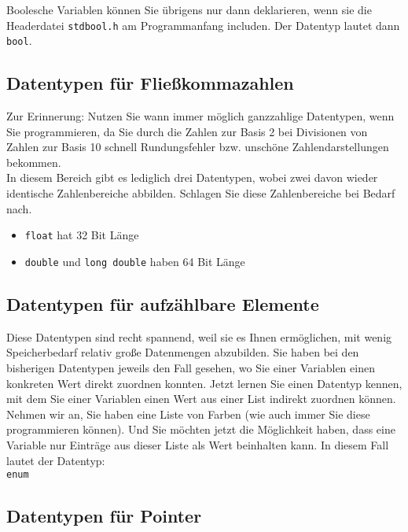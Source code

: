 Boolesche Variablen können Sie übrigens nur dann deklarieren, wenn sie die Headerdatei \verb|stdbool.h| am Programmanfang includen. Der Datentyp lautet dann \verb|bool|.\\

\subsection{Datentypen für Fließkommazahlen}

Zur Erinnerung: Nutzen Sie wann immer möglich ganzzahlige Datentypen, wenn Sie programmieren, da Sie durch die Zahlen zur Basis 2 bei Divisionen von Zahlen zur Basis 10 schnell Rundungsfehler bzw. unschöne Zahlendarstellungen bekommen.\\

In diesem Bereich gibt es lediglich drei Datentypen, wobei zwei davon wieder identische Zahlenbereiche abbilden. Schlagen Sie diese Zahlenbereiche bei Bedarf nach.\\

\begin{itemize}
	\item \verb|float| hat 32 Bit Länge
	\item \verb|double| und \verb|long double| haben 64 Bit Länge
\end{itemize}

\subsection{Datentypen für aufzählbare Elemente}

Diese Datentypen sind recht spannend, weil sie es Ihnen ermöglichen, mit wenig Speicherbedarf relativ große Datenmengen abzubilden. Sie haben bei den bisherigen Datentypen jeweils den Fall gesehen, wo Sie einer Variablen einen konkreten Wert direkt zuordnen konnten. Jetzt lernen Sie einen Datentyp kennen, mit dem Sie einer Variablen einen Wert aus einer List indirekt zuordnen können.\\

Nehmen wir an, Sie haben eine Liste von Farben (wie auch immer Sie diese programmieren können). Und Sie möchten jetzt die Möglichkeit haben, dass eine Variable nur Einträge aus dieser Liste als Wert beinhalten kann. In diesem Fall lautet der Datentyp:\\

\verb|enum|\\

\subsection{Datentypen für Pointer}

